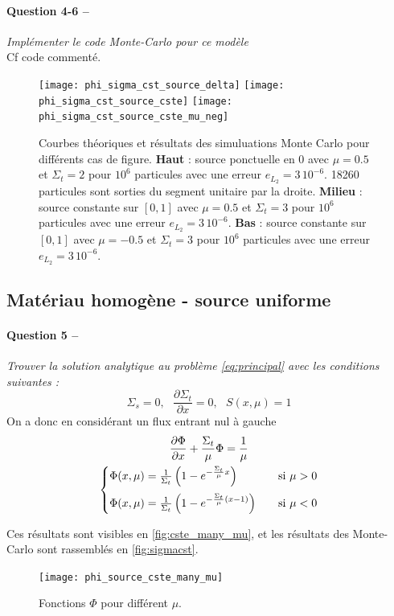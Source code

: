 \documentclass[11pt,a4paper]{article}
\newcommand{\dx}[1]{\dfrac{\partial #1}{\partial x}}
\newcommand{\question}[2]{\paragraph{Question #1 --}\hspace{-7pt}\textit{#2} \\}
\begin{document}
\question{4-6}{Implémenter le code Monte-Carlo pour ce modèle}

Cf code commenté.

\begin{figure}
  \centering
  \texttt{[image: phi\_sigma\_cst\_source\_delta]}
  \texttt{[image: phi\_sigma\_cst\_source\_cste]}
  \texttt{[image: phi\_sigma\_cst\_source\_cste\_mu\_neg]}
  \caption{Courbes théoriques et résultats des simuluations Monte Carlo pour différents cas de figure.
    \textbf{Haut} : source ponctuelle en 0 avec $\mu=0.5$ et $\Sigma_t=2$ pour $10^6$ particules avec une erreur $e_{L_2} = 3\,10^{-6}$. 18260 particules sont sorties du segment unitaire par la droite. 
    \textbf{Milieu} : source constante sur $[0,1]$ avec $\mu=0.5$ et $\Sigma_t=3$ pour $10^6$ particules avec une erreur $e_{L_2} = 3\,10^{-6}$.
    \textbf{Bas} :  source constante sur $[0,1]$ avec $\mu=-0.5$ et $\Sigma_t=3$ pour $10^6$ particules avec une erreur $e_{L_2} = 3\,10^{-6}$.}
  \label{fig:sigmacst}
\end{figure}

\subsection{Matériau homogène - source uniforme}

\question{5}{Trouver la solution analytique au problème \autoref{eq:principal} avec les conditions suivantes :}

\begin{equation}
  \Sigma_s=0, ~~~ \dx{\Sigma_t} = 0, ~~~ S(x, \mu) = 1
\end{equation}
On a donc en considérant un flux entrant nul à gauche 
\begin{gather}
  \dx{\Phi} + \frac{\Sigma_t}{\mu} \Phi = \frac{1}{\mu} \\
  \begin{cases}
    \Phi(x, \mu)= \frac{1}{\Sigma_t}\left( 1-e^{-\frac{\Sigma_t}{\mu}x}\right) &~~~ \mbox{si } \mu>0 \medskip \\ %
    \Phi(x, \mu)= \frac{1}{\Sigma_t}\left( 1-e^{-\frac{\Sigma_t}{\mu}(x-1)}\right) &~~~ \mbox{si } \mu<0 
  \end{cases}
\end{gather}

Ces résultats sont visibles en \autoref{fig:cste_many_mu}, et les résultats des Monte-Carlo sont rassemblés en \autoref{fig:sigmacst}.
\begin{figure}
  \centering
  \texttt{[image: phi\_source\_cste\_many\_mu]}
  \caption{Fonctions $\Phi$ pour différent $\mu$.}
  \label{fig:cste_many_mu}
\end{figure}
\end{document}
